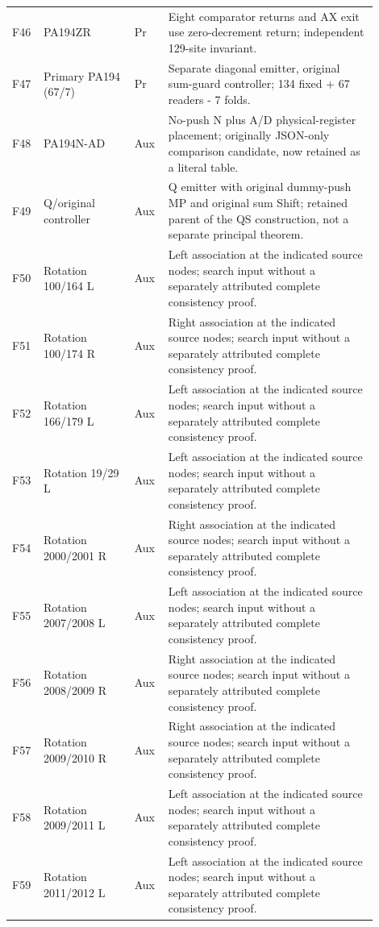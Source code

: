 \begin{longtable}{@{}p{0.055\linewidth}p{0.235\linewidth}p{0.08\linewidth}p{0.535\linewidth}@{}}
F46 & PA194ZR & Pr & Eight comparator returns and AX exit use zero-decrement return; independent 129-site invariant. \\
F47 & Primary PA194 (67/7) & Pr & Separate diagonal emitter, original sum-guard controller; 134 fixed + 67 readers - 7 folds. \\
F48 & PA194N-AD & Aux & No-push N plus A/D physical-register placement; originally JSON-only comparison candidate, now retained as a literal table. \\
F49 & Q/original controller & Aux & Q emitter with original dummy-push MP and original sum Shift; retained parent of the QS construction, not a separate principal theorem. \\
F50 & Rotation 100/164 L & Aux & Left association at the indicated source nodes; search input without a separately attributed complete consistency proof. \\
F51 & Rotation 100/174 R & Aux & Right association at the indicated source nodes; search input without a separately attributed complete consistency proof. \\
F52 & Rotation 166/179 L & Aux & Left association at the indicated source nodes; search input without a separately attributed complete consistency proof. \\
F53 & Rotation 19/29 L & Aux & Left association at the indicated source nodes; search input without a separately attributed complete consistency proof. \\
F54 & Rotation 2000/2001 R & Aux & Right association at the indicated source nodes; search input without a separately attributed complete consistency proof. \\
F55 & Rotation 2007/2008 L & Aux & Left association at the indicated source nodes; search input without a separately attributed complete consistency proof. \\
F56 & Rotation 2008/2009 R & Aux & Right association at the indicated source nodes; search input without a separately attributed complete consistency proof. \\
F57 & Rotation 2009/2010 R & Aux & Right association at the indicated source nodes; search input without a separately attributed complete consistency proof. \\
F58 & Rotation 2009/2011 L & Aux & Left association at the indicated source nodes; search input without a separately attributed complete consistency proof. \\
F59 & Rotation 2011/2012 L & Aux & Left association at the indicated source nodes; search input without a separately attributed complete consistency proof. \\

\end{longtable}
